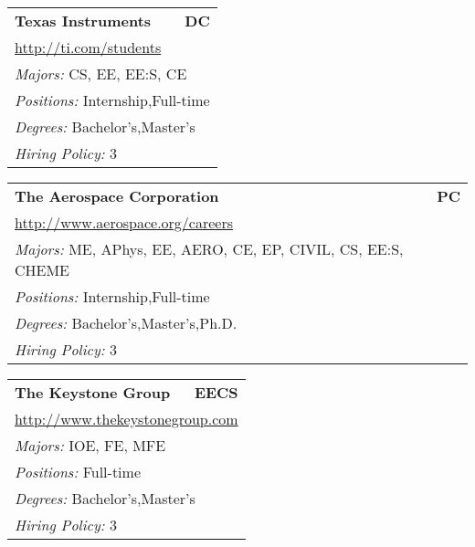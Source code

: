 \documentclass[twoside]{article}
\begin{document}
\begin{center}
\begin{multicols}{3}
\begin{FlushLeft}
\begin{minipage}{\columnwidth}
\end{minipage}
 
\begin{minipage}{\columnwidth}\begin{tabularx}{.95\columnwidth}{Xr}
                 {\Large\bf Texas Instruments} & {\Large\bf DC}\\
    \multicolumn{2}{p{.95\columnwidth}}{\url{http://ti.com/students}}\\
    \multicolumn{2}{p{.95\columnwidth}}{\emph{Majors:} CS, EE, EE:S, CE}\\
    \multicolumn{2}{p{.95\columnwidth}}{\emph{Positions:} Internship,Full-time}\\
    \multicolumn{2}{p{.95\columnwidth}}{\emph{Degrees:} Bachelor's,Master's}\\
    \multicolumn{2}{p{.95\columnwidth}}{\emph{Hiring Policy:} 3}\\
    \end{tabularx}
    
\end{minipage}
 
\begin{minipage}{\columnwidth}\begin{tabularx}{.95\columnwidth}{Xr}
                 {\Large\bf The Aerospace Corporation} & {\Large\bf PC}\\
    \multicolumn{2}{p{.95\columnwidth}}{\url{http://www.aerospace.org/careers}}\\
    \multicolumn{2}{p{.95\columnwidth}}{\emph{Majors:} ME, APhys, EE, AERO, CE, EP, CIVIL, CS, EE:S, CHEME}\\
    \multicolumn{2}{p{.95\columnwidth}}{\emph{Positions:} Internship,Full-time}\\
    \multicolumn{2}{p{.95\columnwidth}}{\emph{Degrees:} Bachelor's,Master's,Ph.D.}\\
    \multicolumn{2}{p{.95\columnwidth}}{\emph{Hiring Policy:} 3}\\
    \end{tabularx}
    
\end{minipage}
 
\begin{minipage}{\columnwidth}\begin{tabularx}{.95\columnwidth}{Xr}
                 {\Large\bf The Keystone Group} & {\Large\bf EECS}\\
    \multicolumn{2}{p{.95\columnwidth}}{\url{http://www.thekeystonegroup.com}}\\
    \multicolumn{2}{p{.95\columnwidth}}{\emph{Majors:} IOE, FE, MFE}\\
    \multicolumn{2}{p{.95\columnwidth}}{\emph{Positions:} Full-time}\\
    \multicolumn{2}{p{.95\columnwidth}}{\emph{Degrees:} Bachelor's,Master's}\\
    \multicolumn{2}{p{.95\columnwidth}}{\emph{Hiring Policy:} 3}\\
    \end{tabularx}
    

\end{minipage}
\end{FlushLeft}
\end{multicols}
\end{center}
\end{document}
